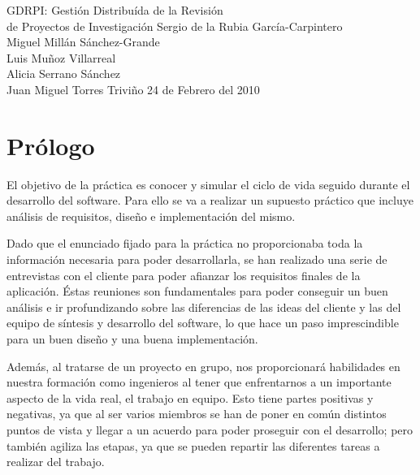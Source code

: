 \documentclass[12pt,a4paper,titlepage,spanish,twoside]{book}
\begin{document}
{GDRPI: Gestión Distribuída de la Revisión\\de Proyectos de Investigación}
{Sergio de la Rubia García-Carpintero\\Miguel Millán Sánchez-Grande\\Luis
  Muñoz Villarreal\\Alicia Serrano Sánchez\\Juan Miguel Torres Triviño}
{24 de Febrero del 2010}


\tableofcontents
\newpage

\listoffigures

\chapter*{Prólogo}
El objetivo de la práctica es conocer y simular el ciclo de vida seguido
durante el desarrollo del software. Para ello se va a realizar un supuesto
práctico que incluye análisis de requisitos, diseño e implementación del
mismo. 

Dado que el enunciado fijado para la práctica no proporcionaba toda la
información necesaria para poder desarrollarla, se han realizado
una serie de entrevistas con el cliente para poder afianzar los requisitos
finales 
de la aplicación. Éstas reuniones son fundamentales para poder conseguir un
buen análisis e ir profundizando sobre las diferencias de las ideas del
cliente y las del equipo de síntesis y desarrollo del software, lo que hace
un paso imprescindible para un buen diseño y una buena
implementación.

Además, al tratarse de un proyecto en grupo, nos
proporcionará habilidades en nuestra formación como ingenieros al tener que
enfrentarnos a un importante aspecto de la vida real, el trabajo en
equipo. Esto tiene partes positivas y negativas, ya que al ser varios
miembros se han de poner en común distintos puntos de vista y llegar a un
acuerdo para poder proseguir con el desarrollo; pero también agiliza las
etapas, ya que se pueden repartir las diferentes tareas a realizar del
trabajo. 
\end{document}
